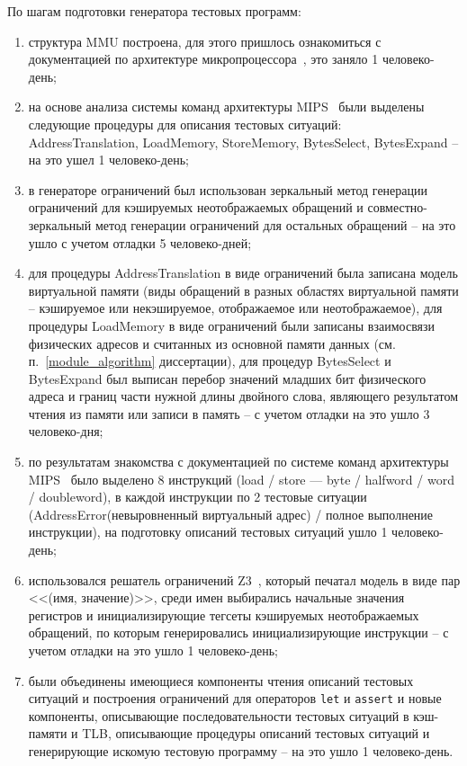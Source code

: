 По шагам подготовки генератора тестовых программ:
\begin{enumerate}
  \item\label{step_mmu} структура MMU построена, для этого пришлось ознакомиться с
  документацией по архитектуре микропроцессора~\cite{mips64_III},
  это заняло 1 человеко-день;
  \item\label{step_procedures}
  на основе анализа системы команд архитектуры MIPS~\cite{mips64_II}
  были выделены следующие процедуры для описания тестовых
  ситуаций:\\
  AddressTranslation, LoadMemory, StoreMemory, BytesSelect,
  BytesExpand -- на это ушел 1 человеко-день;
  \item в генераторе ограничений был использован зеркальный метод
  генерации ограничений для кэшируемых неотображаемых обращений и
  совместно-зеркальный метод генерации ограничений для остальных
  обращений -- на это ушло с учетом отладки 5 человеко-дней;
  \item для процедуры AddressTranslation в виде ограничений была
  записана модель виртуальной памяти (виды обращений в разных
  областях виртуальной памяти -- кэшируемое или некэшируемое,
  отображаемое или неотображаемое), для процедуры LoadMemory в виде
  ограничений были записаны взаимосвязи физических адресов и
  считанных из основной памяти данных (см.
  п.~\ref{module_algorithm} диссертации), для процедур BytesSelect и
  BytesExpand был выписан перебор значений младших бит физического
  адреса и границ части нужной длины двойного слова, являющего
  результатом чтения из памяти или записи в память -- с учетом
  отладки на это ушло 3 человеко-дня;
  \item\label{step_testsituations}
   по результатам знакомства с документацией по системе команд
  архитектуры MIPS~\cite{mips64_II} было выделено 8 инструкций
  (load / store --- byte / halfword / word / doubleword), в каждой инструкции по
  2 тестовые ситуации (AddressError(невыровненный виртуальный
  адрес) / полное выполнение инструкции), на подготовку описаний
  тестовых ситуаций ушло 1 человеко-день;
  \item\label{step_z3} использовался решатель ограничений Z3~\cite{Z3}, который
  печатал модель в виде пар <<(имя, значение)>>, среди имен
  выбирались начальные значения регистров и инициализирующие тегсеты
  кэшируемых неотображаемых обращений, по которым генерировались
  инициализирующие инструкции -- с учетом отладки на это ушло 1
  человеко-день;
  \item\label{step_compose} были объединены имеющиеся компоненты чтения описаний
  тестовых ситуаций и построения ограничений для операторов
  \texttt{let} и \texttt{assert} и новые компоненты, описывающие
  последовательности тестовых ситуаций в кэш-памяти и TLB,
  описывающие процедуры описаний тестовых ситуаций и генерирующие
  искомую тестовую программу -- на это ушло 1 человеко-день.
\end{enumerate}

